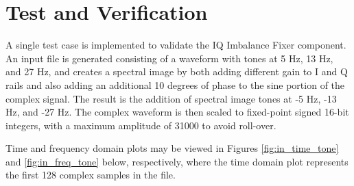 \documentclass{article}
\begin{document}
	\section*{Test and Verification}
	\begin{flushleft}
	A single test case is implemented to validate the IQ Imbalance Fixer component. An input file is generated consisting of a waveform with tones at 5 Hz, 13 Hz, and 27 Hz, and creates a spectral image by both adding different gain to I and Q rails and also adding an additional 10 degrees of phase to the sine portion of the complex signal. The result is the addition of spectral image tones at -5 Hz, -13 Hz, and -27 Hz. The complex waveform is then scaled to fixed-point signed 16-bit integers, with a maximum amplitude of 31000 to avoid roll-over.\medskip

Time and frequency domain plots may be viewed in Figures \ref{fig:in_time_tone} and \ref{fig:in_freq_tone} below, respectively, where the time domain plot represents the first 128 complex samples in the file.
	\end{flushleft}
\end{document}
